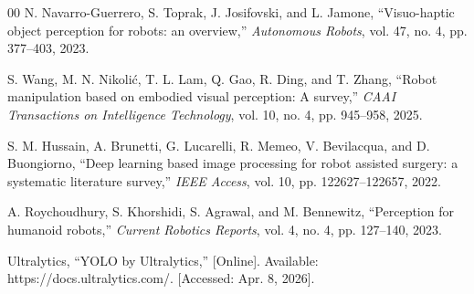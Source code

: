 \documentclass[conference]{IEEEtran}
\begin{document}
\begin{thebibliography}{00}
N. Navarro-Guerrero, S. Toprak, J. Josifovski, and L. Jamone,
``Visuo-haptic object perception for robots: an overview,''
\textit{Autonomous Robots}, vol. 47, no. 4, pp. 377--403, 2023.

S. Wang, M. N. Nikolić, T. L. Lam, Q. Gao, R. Ding, and T. Zhang,
``Robot manipulation based on embodied visual perception: A survey,''
\textit{CAAI Transactions on Intelligence Technology}, vol. 10, no. 4, pp. 945--958, 2025.

S. M. Hussain, A. Brunetti, G. Lucarelli, R. Memeo, V. Bevilacqua, and D. Buongiorno,
``Deep learning based image processing for robot assisted surgery: a systematic literature survey,''
\textit{IEEE Access}, vol. 10, pp. 122627--122657, 2022.

A. Roychoudhury, S. Khorshidi, S. Agrawal, and M. Bennewitz,
``Perception for humanoid robots,''
\textit{Current Robotics Reports}, vol. 4, no. 4, pp. 127--140, 2023.

Ultralytics,
``YOLO by Ultralytics,'' [Online]. Available: https://docs.ultralytics.com/. [Accessed: Apr. 8, 2026].

\end{thebibliography}
\end{document}
